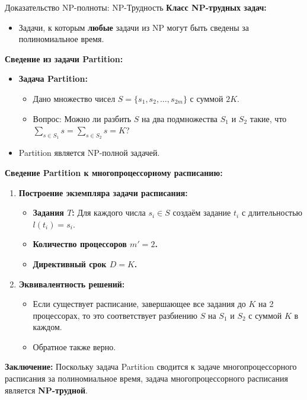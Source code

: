 \documentclass{beamer}
\begin{document}
\begin{frame}{Доказательство NP-полноты: NP-Трудность}
    \textbf{Класс NP-трудных задач:}
    \begin{itemize}
        \item Задачи, к которым \textbf{любые} задачи из NP могут быть сведены за полиномиальное время.
    \end{itemize}

    \textbf{Сведение из задачи Partition:}
    \begin{itemize}
        \item \textbf{Задача Partition:}
        \begin{itemize}
            \item Дано множество чисел \( S = \{s_1, s_2, \dots, s_{2m}\} \) с суммой \( 2K \).
            \item Вопрос: Можно ли разбить \( S \) на два подмножества \( S_1 \) и \( S_2 \) такие, что \( \sum_{s \in S_1} s = \sum_{s \in S_2} s = K \)?
        \end{itemize}
        \item Partition является NP-полной задачей.
    \end{itemize}

    \textbf{Сведение Partition к многопроцессорному расписанию:}
    \begin{enumerate}
        \item \textbf{Построение экземпляра задачи расписания:}
        \begin{itemize}
            \item \textbf{Задания \( T \):} Для каждого числа \( s_i \in S \) создаём задание \( t_i \) с длительностью \( l(t_i) = s_i \).
            \item \textbf{Количество процессоров \( m' = 2 \).}
            \item \textbf{Директивный срок \( D = K \).}
        \end{itemize}
        \item \textbf{Эквивалентность решений:}
        \begin{itemize}
            \item Если существует расписание, завершающее все задания до \( K \) на 2 процессорах, то это соответствует разбиению \( S \) на \( S_1 \) и \( S_2 \) с суммой \( K \) в каждом.
            \item Обратное также верно.
        \end{itemize}
    \end{enumerate}

    \textbf{Заключение:} Поскольку задача Partition сводится к задаче многопроцессорного расписания за полиномиальное время, задача многопроцессорного расписания является \textbf{NP-трудной}.
\end{frame}
\end{document}
